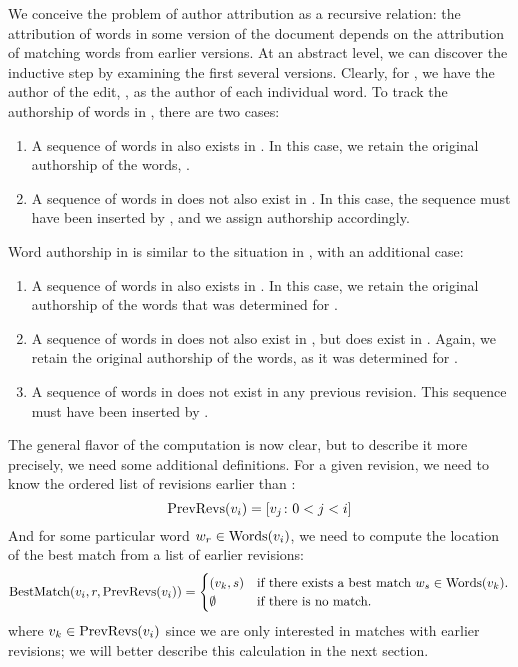 We conceive the problem of author attribution as a recursive relation:
the attribution of words in some version of the document depends on the
attribution of matching words from earlier versions.
At an abstract level, we can discover the inductive step by examining
the first several versions.
Clearly, for , we have the author of the edit,
, as the author of each individual word.
To track the authorship of words in , there are two cases:
\begin{enumerate}
\item A sequence of words in  also exists in .
	In this case, we retain the original authorship of the words,
	.
\item A sequence of words in  does not also exist in .
	In this case, the sequence must have been inserted by
	, and we assign authorship accordingly.
\end{enumerate}
Word authorship in  is similar to the situation in
, with an additional case:
\begin{enumerate}
\item A sequence of words in  also exists in .
	In this case, we retain the original authorship of the words
	that was determined for .
\item A sequence of words in  does not also exist in ,
	but does exist in .
	Again, we retain the original authorship of the words, as it was
	determined for .
\item A sequence of words in  does not exist in any previous
	revision.
	This sequence must have been inserted by .
\end{enumerate}

The general flavor of the computation is now clear, but to describe it
more precisely, we need some additional definitions.
For a given revision, we need to know the ordered list of revisions
earlier than :
\begin{equation}
    \prevrevs{\version{i}} = \left[ \version{j} \colon  0 < j < i \right]
\label{def:prevrevs}
\end{equation}
And for some particular
word $w_r \in \mathrm{Words}(v_{i})$, we need to compute the
location of the best match from a list of earlier revisions:
\begin{equation}
    \match{\version{i}, r, \prevrevs{\version{i}}} =
    \begin{cases}
	(\version{k}, s) & \text{if there exists a best match $w_s \in \words{\version{k}}$.} \\
	\emptyset & \text{if there is no match.} \\
    \end{cases}
\label{def:bestmatch}
\end{equation}
where $v_{k} \in \mathrm{PrevRevs}(v_{i})$ since we are only
interested in matches with earlier revisions; we will better describe
this calculation in the next section.

